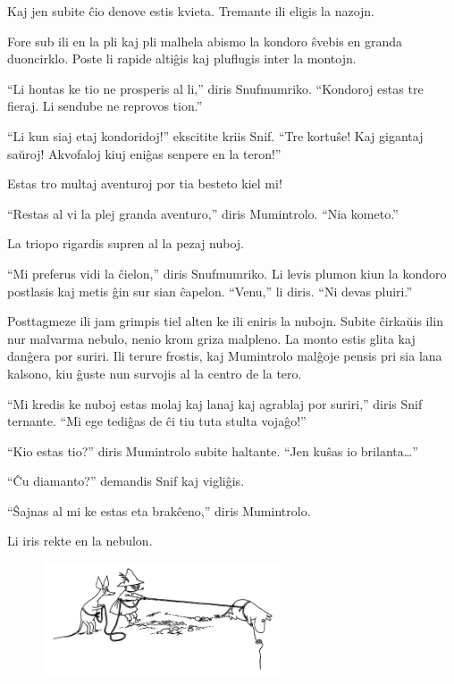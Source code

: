 Kaj jen subite ĉio denove estis kvieta. Tremante ili eligis la nazojn.

Fore sub ili en la pli kaj pli malhela abismo la kondoro ŝvebis en granda duoncirklo. Poste li rapide altiĝis kaj pluflugis inter la montojn.

``Li hontas ke tio ne prosperis al li,'' diris Snufmumriko. ``Kondoroj estas tre fieraj. Li sendube ne reprovos tion.''

``Li kun siaj etaj kondoridoj!'' ekscitite kriis Snif. ``Tre kortuŝe! Kaj gigantaj saŭroj! Akvofaloj kiuj eniĝas senpere en la teron!''

Estas tro multaj aventuroj por tia besteto kiel mi!

``Restas al vi la plej granda aventuro,'' diris Mumintrolo. ``Nia kometo.''

La triopo rigardis supren al la pezaj nuboj.

``Mi preferus vidi la ĉielon,'' diris Snufmumriko. Li levis plumon kiun la kondoro postlasis kaj metis ĝin sur sian ĉapelon. ``Venu,'' li diris. ``Ni devas pluiri.''

Posttagmeze ili jam grimpis tiel alten ke ili eniris la nubojn. Subite ĉirkaŭis ilin nur malvarma nebulo, nenio krom griza malpleno. La monto estis glita kaj danĝera por suriri. Ili terure frostis, kaj Mumintrolo malĝoje pensis pri sia lana kalsono, kiu ĝuste nun survojis al la centro de la tero.

``Mi kredis ke nuboj estas molaj kaj lanaj kaj agrablaj por suriri,'' diris Snif ternante. ``Mi ege tediĝas de ĉi tiu tuta stulta vojaĝo!''

``Kio estas tio?'' diris Mumintrolo subite haltante. ``Jen kuŝas io brilanta{\ldots}''

``Ĉu diamanto?'' demandis Snif kaj vigliĝis.

``Ŝajnas al mi ke estas eta brakĉeno,'' diris Mumintrolo.

Li iris rekte en la nebulon.

\begin{figure}[htbp]
\centering
\includegraphics[width=200pt,height=96pt]{4-3.png}
\caption{}
\label{4-3}
\end{figure}

